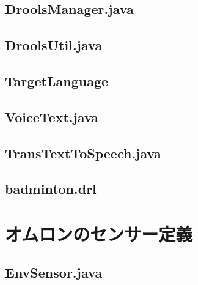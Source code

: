 \documentclass{kuisthesis}			%
\begin{document}
\subsection{DroolsManager.java}


\subsection{DroolsUtil.java}


\subsection{TargetLanguage}


\subsection{VoiceText.java}


\subsection{TransTextToSpeech.java}


\subsection{badminton.drl}


\section{オムロンのセンサー定義}
\subsection{EnvSensor.java}

\end{document}
